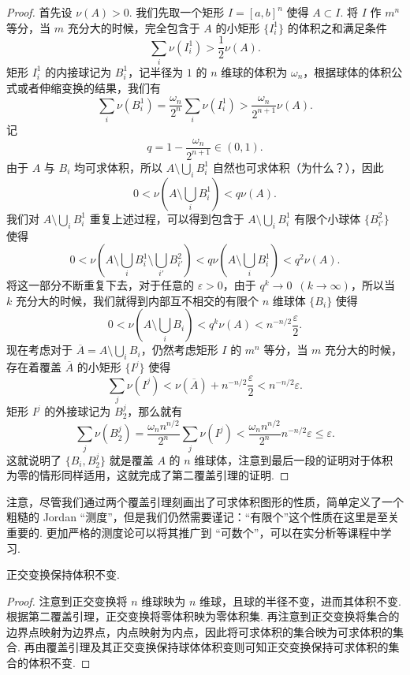 \begin{enumerate}[label=(\arabic*)]
          \begin{proof}
              首先设 $\nu(A)>0$. 我们先取一个矩形 $I = \left[a, b\right]^n$ 使得 $A\subset I$. 将 $I$ 作 $m^n$ 等分，当 $m$ 充分大的时候，完全包含于 $A$ 的小矩形 $\{I_i^1\}$ 的体积之和满足条件 \[\sum_i\nu(I_i^1) > \frac12\nu(A).\]
              矩形 $I_i^1$ 的内接球记为 $B_i^1$，记半径为 $1$ 的 $n$ 维球的体积为 $\omega_n$，根据球体的体积公式或者伸缩变换的结果，我们有 \[\sum_i\nu(B_i^1) = \frac{\omega_n}{2^n}\sum_i\nu(I_i^1) > \frac{\omega_n}{2^{n+1}}\nu(A).\]
              记 \[q = 1 - \frac{\omega_n}{2^{n+1}}\in(0, 1).\]
              由于 $A$ 与 $B_i$ 均可求体积，所以 $A \setminus \bigcup_iB_i^1$ 自然也可求体积（为什么？），因此 \[ 0 < \nu\left(A \setminus \bigcup_iB_i^1\right) < q\nu(A).\]
              我们对 $A\setminus \bigcup\limits_iB_i^1$ 重复上述过程，可以得到包含于 $A\setminus \bigcup\limits_iB_i^1$ 有限个小球体 $\{B_{i'}^2\}$ 使得 \[0 < \nu\left(A\setminus \bigcup_iB_i^1\setminus \bigcup_{i'}B_{i'}^2\right) < q\nu\left(A\setminus \bigcup_iB_i^1\right) < q^2\nu(A).\]
              将这一部分不断重复下去，对于任意的 $\varepsilon > 0$，由于 $q^k\to 0\enspace (k\to \infty)$，所以当 $k$ 充分大的时候，我们就得到内部互不相交的有限个 $n$ 维球体 $\{B_i\}$ 使得 \[0 < \nu\left(A\setminus \bigcup_iB_i\right) < q^k\nu(A) < n^{-n/2}\frac{\varepsilon}{2}.\]
              现在考虑对于 $\overline{A} = A\setminus \bigcup\limits_iB_i$，仍然考虑矩形 $I$ 的 $m^n$ 等分，当 $m$ 充分大的时候，存在着覆盖 $\overline{A}$ 的小矩形 $\{I^j\}$ 使得 \[\sum_j\nu(I^j) < \nu(\overline{A}) + n^{-n/2}\frac{\varepsilon}{2} < n^{-n/2}\varepsilon.\]
              矩形 $I^j$ 的外接球记为 $B_2^j$，那么就有 \[\sum_j\nu(B_2^j) = \frac{\omega_nn^{n/2}}{2^n}\sum_j\nu(I^j) < \frac{\omega_nn^{n/2}}{2^n}n^{-n/2}\varepsilon \leqslant \varepsilon.\]
              这就说明了 $\{B_i, B_2^j\}$ 就是覆盖 $A$ 的 $n$ 维球体，注意到最后一段的证明对于体积为零的情形同样适用，这就完成了第二覆盖引理的证明.
          \end{proof}

          注意，尽管我们通过两个覆盖引理刻画出了可求体积图形的性质，简单定义了一个粗糙的 Jordan ``测度''，但是我们仍然需要谨记：``有限个''这个性质在这里是至关重要的. 更加严格的测度论可以将其推广到 ``可数个''，可以在实分析等课程中学习.

          \begin{theorem}{}{}
              正交变换保持体积不变.
          \end{theorem}

          \begin{proof}
              注意到正交变换将 $n$ 维球映为 $n$ 维球，且球的半径不变，进而其体积不变. 根据第二覆盖引理，正交变换将零体积映为零体积集. 再注意到正交变换将集合的边界点映射为边界点，内点映射为内点，因此将可求体积的集合映为可求体积的集合. 再由覆盖引理及其正交变换保持球体体积变则可知正交变换保持可求体积的集合的体积不变.
          \end{proof}


\end{enumerate}
